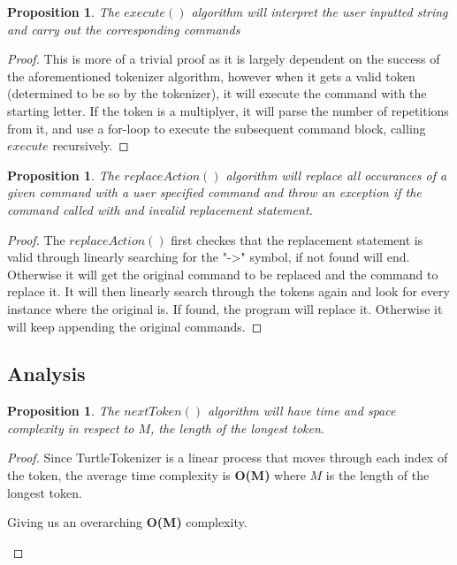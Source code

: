 \documentclass[12pt]{article}
\newtheorem{proposition}[theorem]{Proposition}
\begin{document}
\begin{proposition}
The $execute()$ algorithm will interpret the user inputted string and carry out the
corresponding commands
\end{proposition}

\begin{proof}
This is more of a trivial proof as it is largely dependent on the success of the aforementioned
tokenizer algorithm, however when it gets a valid token (determined to be so by the tokenizer),
it will execute the command with the starting letter. If the token is a multiplyer, it will
parse the number of repetitions from it, and use a for-loop to execute the subsequent command
block, calling $execute$ recursively.
\end{proof}

\begin{proposition}
The $replaceAction()$ algorithm will replace all occurances of a given command with a user specified
command and throw an exception if the command called with and invalid replacement statement.
\end{proposition}

\begin{proof}
The $replaceAction()$ first checkes that the replacement statement is valid through linearly searching
for the "-\textgreater" symbol, if not found will end. Otherwise it will get the original command to
be replaced and the command to replace it. It will then linearly search through the tokens again and
look for every instance where the original is. If found, the program will replace it. Otherwise it will
keep appending the original commands.
\end{proof}

\subsection{Analysis}

\begin{proposition}
\label{numq}
The $nextToken()$ algorithm will have time and space complexity in respect to $M$, the length of
the longest token.
\end{proposition}

\begin{proof}
Since TurtleTokenizer is a linear process that moves through each index of the token, the average
time complexity is \textbf{O(M)} where $M$ is the length of the longest token.

\begin{center}
    Giving us an overarching \textbf{O(M)} complexity.
\end{center}

\end{proof}
\end{document}
